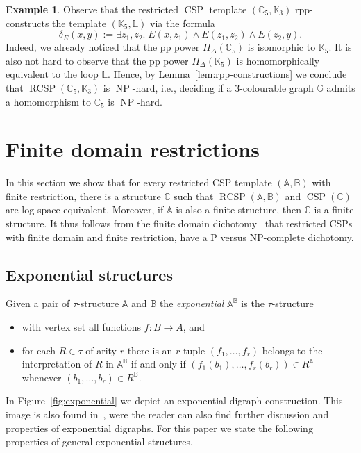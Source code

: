 \documentclass{article}
\theoremstyle{definition}
\newtheorem{example}[theorem]{Example}
\theoremstyle{remark}
\DeclareMathOperator{\NP}{NP}
\DeclareMathOperator{\CSP}{CSP}
\DeclareMathOperator{\RCSP}{RCSP}
\newcommand{\bA}{{\mathbb A}}
\newcommand{\bB}{{\mathbb B}}
\newcommand{\bC}{{\mathbb C}}
\newcommand{\bG}{{\mathbb G}}
\newcommand{\bK}{{\mathbb K}}
\newcommand{\bL}{{\mathbb L}}
\begin{document}
\begin{example}
    Observe that the restricted $\CSP$ template $(\bC_5,\bK_3)$ rpp-constructs the template
    $(\bK_5,\bL)$ via the formula
    \[
    \delta_E(x,y):=\exists z_1,z_2.\; E(x,z_1)\land E(z_1,z_2)\land E(z_2,y).
    \]
    Indeed, we already noticed that the pp power $\Pi_\Delta(\bC_5)$ is isomorphic to $\bK_5$. 
    It is also not hard to observe that the pp power $\Pi_\Delta(\bK_5)$ is homomorphically equivalent
    to the loop $\bL$. Hence, by Lemma~\ref{lem:rpp-constructions} we conclude that $\RCSP(\bC_5,\bK_3)$
    is $\NP$-hard, i.e., deciding if a $3$-colourable graph $\bG$ admits a homomorphism to $\bC_5$
    is $\NP$-hard.
\end{example}

\section{Finite domain restrictions}
\label{sect:finite-domain-restrictions}

In this section we show that for every restricted CSP template $(\bA,\bB)$ with finite restriction,
there is a structure $\bC$ such that $\RCSP(\bA,\bB)$ and $\CSP(\bC)$ are log-space equivalent. 
Moreover, if $\bA$ is also a finite structure, then $\bC$ is a finite structure. It thus follows
from the finite domain dichotomy~\cite{BulatovFVConjecture,ZhukFVConjecture} that restricted CSPs
with finite domain and finite restriction, have a P versus NP-complete dichotomy. 

\subsection{Exponential structures}

Given a pair of $\tau$-structure $\bA$ and $\bB$ the \emph{exponential} $\bA^\bB$ is the $\tau$-structure 
\begin{itemize}
    \item with vertex set all functions $f\colon B\to A$, and
    \item for each $R\in\tau$ of arity $r$ there is an $r$-tuple $(f_1,\dots, f_r)$ belongs
    to the interpretation of $R$ in $\bA^\bB$
    if and only if $(f_1(b_1),\dots, f_r(b_r))\in R^\bA$ whenever $(b_1,\dots, b_r) \in R^\bB$.
\end{itemize}
In Figure~\ref{fig:exponential} we depict an exponential digraph construction. This image is also
found in~\cite{HellNesetril}, were the reader can also find further discussion and properties
of exponential digraphs. For this paper we state the following properties of general exponential
structures.
\end{document}
